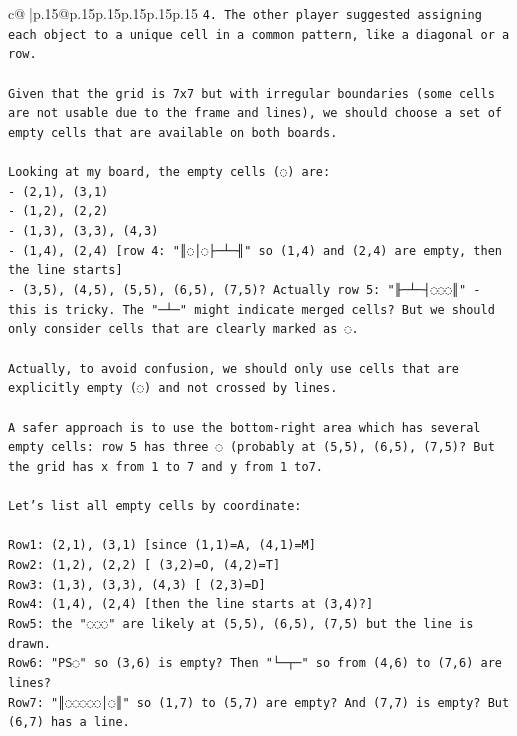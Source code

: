 \documentclass{article}
\begin{document}
{\begin{supertabular}{c@{$\;$}|p{.15\linewidth}@{}p{.15\linewidth}p{.15\linewidth}p{.15\linewidth}p{.15\linewidth}p{.15\linewidth}}
{{{\texttt{4. The other player suggested assigning each object to a unique cell in a common pattern, like a diagonal or a row.} \\
\\ 
\texttt{Given that the grid is 7x7 but with irregular boundaries (some cells are not usable due to the frame and lines), we should choose a set of empty cells that are available on both boards.} \\
\\ 
\texttt{Looking at my board, the empty cells (◌) are:} \\
\texttt{{-} (2,1), (3,1)} \\
\texttt{{-} (1,2), (2,2)} \\
\texttt{{-} (1,3), (3,3), (4,3)} \\
\texttt{{-} (1,4), (2,4) {[}row 4: "║◌│◌├─┴─╢" so (1,4) and (2,4) are empty, then the line starts{]}} \\
\texttt{{-} (3,5), (4,5), (5,5), (6,5), (7,5)? Actually row 5: "╟─┴─┤◌◌◌║" {-} this is tricky. The "─┴─" might indicate merged cells? But we should only consider cells that are clearly marked as ◌.} \\
\\ 
\texttt{Actually, to avoid confusion, we should only use cells that are explicitly empty (◌) and not crossed by lines.} \\
\\ 
\texttt{A safer approach is to use the bottom{-}right area which has several empty cells: row 5 has three ◌ (probably at (5,5), (6,5), (7,5)? But the grid has x from 1 to 7 and y from 1 to7.} \\
\\ 
\texttt{Let's list all empty cells by coordinate:} \\
\\ 
\texttt{Row1: (2,1), (3,1) {[}since (1,1)=A, (4,1)=M{]}} \\
\texttt{Row2: (1,2), (2,2) {[} (3,2)=O, (4,2)=T{]}} \\
\texttt{Row3: (1,3), (3,3), (4,3) {[} (2,3)=D{]}} \\
\texttt{Row4: (1,4), (2,4) {[}then the line starts at (3,4)?{]}} \\
\texttt{Row5: the "◌◌◌" are likely at (5,5), (6,5), (7,5) but the line is drawn.} \\
\texttt{Row6: "PS◌" so (3,6) is empty? Then "└─┬─" so from (4,6) to (7,6) are lines?} \\
\texttt{Row7: "║◌◌◌◌◌│◌║" so (1,7) to (5,7) are empty? And (7,7) is empty? But (6,7) has a line.} \\
}}}
\end{supertabular}}
\end{document}
